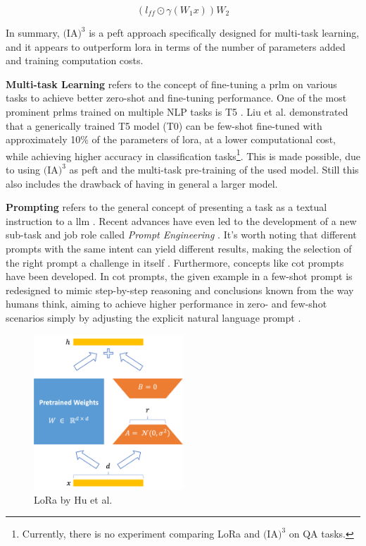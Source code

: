 \begin{equation}
    (l_{ff} \odot \gamma (W_1x))W_2
\end{equation}

In summary, \textbf{$\text{(IA)}^3$} is a \gls{peft} approach specifically designed for multi-task learning, and it appears to outperform \gls{lora} in terms of the number of parameters added and training computation costs.

\textbf{Multi-task Learning} refers to the concept of fine-tuning a \gls{prlm} on various tasks to achieve better zero-shot and fine-tuning performance. One of the most prominent \gls{prlm}s trained on multiple NLP tasks is T5 \cite{raffel_exploring_2023}. Liu et al. \cite{liu_few-shot_2022} demonstrated that a generically trained T5 model (T0) can be few-shot fine-tuned with approximately 10\% of the parameters of \gls{lora}, at a lower computational cost, while achieving higher accuracy in classification tasks\footnote{Currently, there is no experiment comparing LoRa and $\text{(IA)}^3$ on QA tasks.}. This is made possible, due to using $\text{(IA)}^3$ as \gls{peft} and the multi-task pre-training of the used model. Still this also includes the drawback of having in general a larger model.

\textbf{Prompting} refers to the general concept of presenting a task as a textual instruction to a \gls{llm} \cite{brown_language_2020}. Recent advances have even led to the development of a new sub-task and job role called \textit{Prompt Engineering} \cite{white_prompt_2023}. It's worth noting that different prompts with the same intent can yield different results, making the selection of the right prompt a challenge in itself \cite{liu_gpt_2021}. Furthermore, concepts like \gls{cot} prompts have been developed. In \gls{cot} prompts, the given example in a few-shot prompt is redesigned to mimic step-by-step reasoning and conclusions known from the way humans think, aiming to achieve higher performance in zero- and few-shot scenarios simply by adjusting the explicit natural language prompt \cite{wei_chain--thought_2023}.

\begin{figure}
    \centering
    \includegraphics[width=0.5\textwidth]{Grafiken/Lora.png}
    \caption{LoRa by Hu et al. \cite{hu_lora_nodate}}
    \label{fig:lora}
\end{figure}


